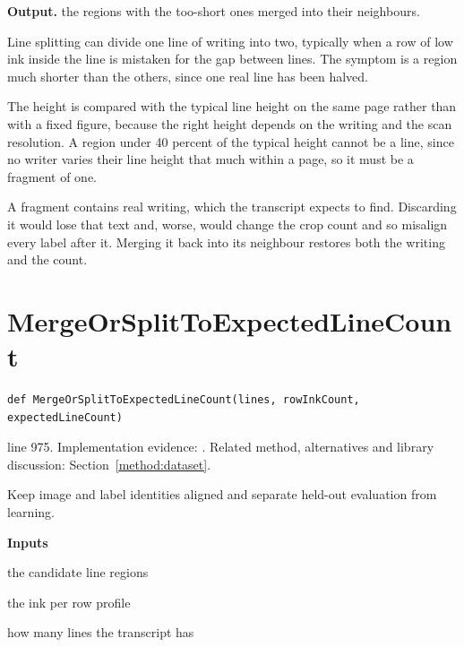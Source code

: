 \noindent\textbf{Output.} the regions with the too-short ones merged into their neighbours.


Line splitting can divide one line of writing into two, typically when a row of low ink inside the line is mistaken for the gap between lines. The symptom is a region much shorter than the others, since one real line has been halved.


The height is compared with the typical line height on the same page rather than with a fixed figure, because the right height depends on the writing and the scan resolution. A region under 40 percent of the typical height cannot be a line, since no writer varies their line height that much within a page, so it must be a fragment of one.


A fragment contains real writing, which the transcript expects to find. Discarding it would lose that text and, worse, would change the crop count and so misalign every label after it. Merging it back into its neighbour restores both the writing and the count.



\section{MergeOrSplitToExpectedLineCount}\label{fn:train:MergeOrSplitToExpectedLineCount}
\begin{lstlisting}[style=sig]
def MergeOrSplitToExpectedLineCount(lines, rowInkCount, expectedLineCount)
\end{lstlisting}
 line 975. Implementation evidence: \cite{code2026}. Related method, alternatives and library discussion: Section~\ref{method:dataset}.


Keep image and label identities aligned and separate held-out evaluation from learning.




\noindent\textbf{Inputs}
\begin{description}[leftmargin=2.2em,style=nextline,font=\normalfont\ttfamily]\setlength\itemsep{1pt}
  \item[{lines}] \normalfont the candidate line regions
  \item[{rowInkCount}] \normalfont the ink per row profile
  \item[{expectedLineCount}] \normalfont how many lines the transcript has
\end{description}

